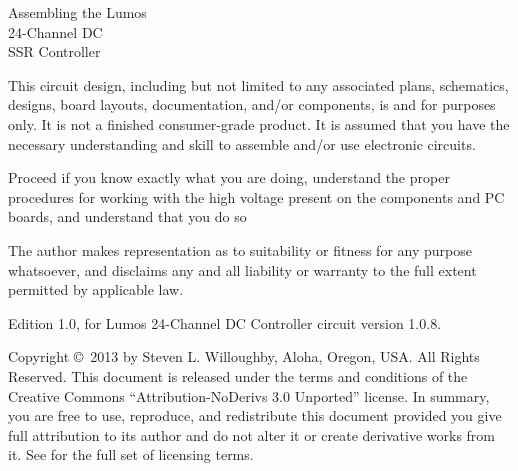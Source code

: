 \documentclass[letterpaper,twoside,onecolumn,openright,final]{memoir}
\begin{document}
\frontmatter

\thispagestyle{empty}
\vfill
\begin{center}
{\fontsize{48}{50}\selectfont
Assembling the Lumos\TM\\24-Channel DC\\SSR Controller\\\strut

\vfill
}

\end{center}

\newpage
\begin{center}


\end{center}

This circuit design, including but not limited to any associated plans, schematics, designs, board layouts, documentation, 
and/or components, is  and for  purposes only. It is not a finished consumer-grade product.
It is assumed that you have the necessary understanding and skill to assemble and/or use electronic circuits.

Proceed  if you know exactly what you are doing, understand the proper procedures for working with the high voltage present on the components and PC boards, and understand that you do so 

The author makes  representation as to suitability or fitness for any purpose whatsoever, and disclaims any and all liability or warranty to the full extent permitted by applicable law.

\strut\vfill
\noindent Edition 1.0, for Lumos 24-Channel DC Controller circuit version 1.0.8.

\smallskip


\noindent Copyright \copyright\ 2013 by Steven L. Willoughby,
Aloha, Oregon, USA.  All Rights Reserved.  
This document is released under the terms and conditions of the 
Creative Commons ``Attribution-NoDerivs 3.0 Unported'' license.  
In summary, you are free to use, reproduce, and redistribute this 
document provided you give full attribution to its author and do not
alter it or create derivative works from it.  See
 for the full
set of licensing terms.
\end{document}
